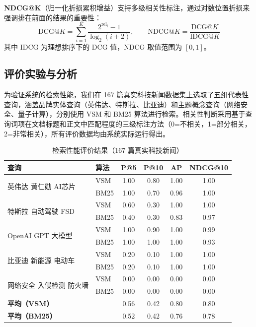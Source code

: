\documentclass[12pt, a4paper]{ctexart}
\begin{document}
\textbf{NDCG@K}（归一化折损累积增益）支持多级相关性标注，通过对数位置折损来强调排在前面的结果的重要性：
\begin{equation}
    \text{DCG}@K = \sum_{i=1}^{K} \frac{2^{\text{rel}_i} - 1}{\log_2(i+2)}, \qquad
    \text{NDCG}@K = \frac{\text{DCG}@K}{\text{IDCG}@K}
\end{equation}
其中 IDCG 为理想排序下的 DCG 值，NDCG 取值范围为 $[0, 1]$。

\subsection{评价实验与分析}

为验证系统的检索性能，我们在 167 篇真实科技新闻数据集上选取了五组代表性查询，涵盖品牌实体查询（英伟达、特斯拉、比亚迪）和主题概念查询（网络安全、量子计算），分别使用 VSM 和 BM25 算法进行检索。相关性判断采用基于查询词项在文档标题和正文中匹配程度的三级标注方法（0=不相关，1=部分相关，2=非常相关），所有评价数据均由系统实际运行得出。

\begin{table}[H]
\centering
\caption{检索性能评价结果（167 篇真实科技新闻）}
\label{tab:eval_results}
\begin{tabular}{llcccc}
\toprule
\textbf{查询} & \textbf{算法} & \textbf{P@5} & \textbf{P@10} & \textbf{AP} & \textbf{NDCG@10} \\
\midrule
\multirow{2}{*}{英伟达 黄仁勋 AI芯片} & VSM & 1.00 & 0.80 & 1.00 & 1.00 \\
                                        & BM25 & 1.00 & 0.70 & 0.96 & 1.00 \\
\midrule
\multirow{2}{*}{特斯拉 自动驾驶 FSD} & VSM & 0.60 & 0.30 & 1.00 & 1.00 \\
                                       & BM25 & 0.40 & 0.30 & 0.83 & 0.97 \\
\midrule
\multirow{2}{*}{OpenAI GPT 大模型} & VSM & 1.00 & 0.90 & 1.00 & 0.99 \\
                                     & BM25 & 1.00 & 1.00 & 1.00 & 0.93 \\
\midrule
\multirow{2}{*}{比亚迪 新能源 电动车} & VSM & 0.20 & 0.10 & 1.00 & 1.00 \\
                                        & BM25 & 0.20 & 0.10 & 1.00 & 1.00 \\
\midrule
\multirow{2}{*}{网络安全 入侵检测 防火墙} & VSM & 0.00 & 0.00 & 0.00 & 0.00 \\
                                          & BM25 & 0.00 & 0.00 & 0.00 & 0.00 \\
\midrule
\multicolumn{2}{l}{\textbf{平均（VSM）}} & 0.56 & 0.42 & 0.80 & 0.80 \\
\multicolumn{2}{l}{\textbf{平均（BM25）}} & 0.52 & 0.42 & 0.76 & 0.78 \\
\bottomrule
\end{tabular}
\end{table}
\end{document}
